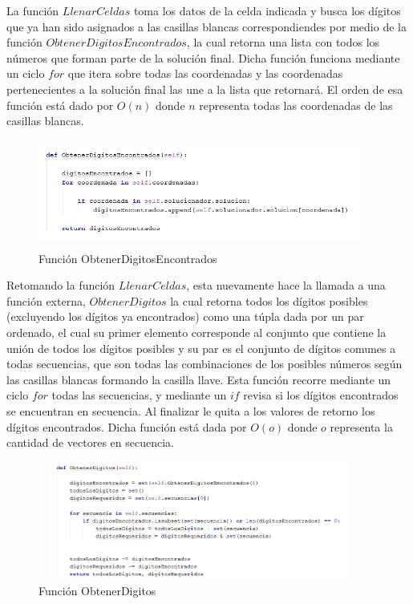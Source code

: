 \documentclass[journal]{IEEEtran}
\begin{document}
\begin{itemize}
		La función $LlenarCeldas$ toma los datos de la celda indicada y busca los dígitos que ya han sido asignados a las casillas blancas correspondiendes por medio de la función $ObtenerDigitosEncontrados$, la cual retorna una lista con todos los números que forman parte de la solución final. Dicha función funciona mediante un ciclo $for$ que itera sobre todas las coordenadas y las coordenadas pertenecientes a la solución final las une a la lista que retornará. El orden de esa función está dado por $O(n)$ donde $n$ representa todas las coordenadas de las casillas blancas. 
		
		\begin{figure}[h]
			\centering
			\includegraphics[height= 100pt, width=300pt]{ObtenerDigitosEncontrados.png}
			\caption{Función ObtenerDigitosEncontrados}
		\end{figure}
		
		
		Retomando la función $LlenarCeldas$, esta nuevamente hace la llamada a una función externa, $ObtenerDigitos$ la cual retorna todos los dígitos posibles (excluyendo los dígitos ya encontrados) como una túpla dada por un par ordenado, el cual su primer elemento corresponde al conjunto que contiene la unión de todos los dígitos posibles y su par es el conjunto de dígitos comunes a todas secuencias, que son todas las combinaciones de los posibles números según las casillas blancas formando la casilla llave. Esta función recorre mediante un ciclo $for$ todas las secuencias, y mediante un $if$ revisa si los dígitos encontrados se encuentran en secuencia. Al finalizar le quita a los valores de retorno los dígitos encontrados. Dicha función está dada por $O(o)$ donde $o$ representa la cantidad de vectores en secuencia. 
		
		\begin{figure}[h]
			\centering
			\includegraphics[height= 110pt, width=300pt]{ObtenerDigitos.png}
			\caption{Función ObtenerDigitos}
		\end{figure}
		

\end{itemize}
\end{document}
